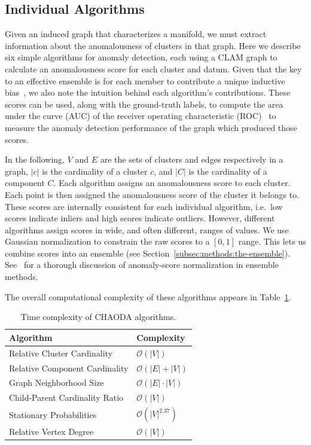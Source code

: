\subsection{Individual Algorithms}
\label{subsec:methods:individual-algorithms}

Given an induced graph that characterizes a manifold, we must extract information about the anomalousness of clusters in that graph.
Here we describe six simple algorithms for anomaly detection, each using a CLAM graph to calculate an anomalousness score for each cluster and datum.
Given that the key to an effective ensemble is for each member to contribute a unique inductive bias~\cite{chen2017outlier}, we also note the intuition behind each algorithm's contributions.
These scores can be used, along with the ground-truth labels, to compute the area under the curve (AUC) of the receiver operating characteristic (ROC)~\cite{fawcett2006introduction} to measure the anomaly detection performance of the graph which produced those scores.

In the following,
$V$ and $E$ are the sets of clusters and edges respectively in a graph,
$|c|$ is the cardinality of a cluster $c$,
and $|C|$ is the cardinality of a component $C$.
Each algorithm assigns an anomalousness score to each cluster.
Each point is then assigned the anomalousness score of the cluster it belongs to.
These scores are internally consistent for each individual algorithm, i.e.\ low scores indicate inliers and high scores indicate outliers.
However, different algorithms assign scores in wide, and often different, ranges of values.
We use Gaussian normalization to constrain the raw scores to a $[0, 1]$ range.
This lets us combine scores into an ensemble (see Section~\ref{subsec:methods:the-ensemble}).
See~\cite{kriegel2011interpreting} for a thorough discussion of anomaly-score normalization in ensemble methods.

The overall computational complexity of these algorithms appears in Table~\ref{table:methods:complexity}.

\begin{table}
\label{table:methods:complexity}
\caption{Time complexity of CHAODA algorithms.}
\begin{tabular}{|l|l|}
\hline
\textbf{Algorithm} & \textbf{Complexity} \\
\hline
 Relative Cluster Cardinality & $\mathcal{O}(|V|)$ \\
 \hline
 Relative Component Cardinality & $\mathcal{O}(|E| + |V|)$  \\
 \hline
 Graph Neighborhood Size & $\mathcal{O}(|E| \cdot |V|)$  \\ 
 \hline
 Child-Parent Cardinality Ratio & $\mathcal{O}(|V|)$ \\ 
 \hline
 Stationary Probabilities & $\mathcal{O}(|V|^{2.37})$ \\ 
 \hline
 Relative Vertex Degree & $\mathcal{O}(|V|)$ \\ \cline{1-5}
 \hline
\end{tabular}
\end{table}

